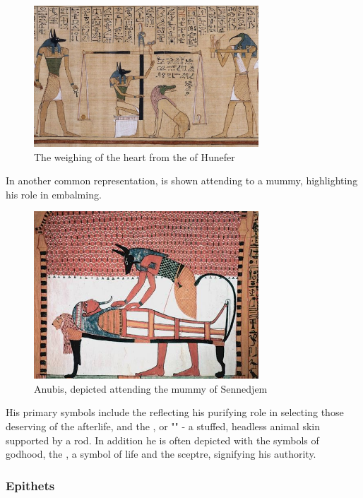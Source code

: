 \begin{figure} [H]
	\centering
	\includegraphics[width=0.75\textwidth]{../photos/Anubis_Hunefer}
	\caption{The weighing of the heart from the  of Hunefer}
\end{figure}

In another common representation,  is shown attending to a mummy, highlighting his role in embalming.

\begin{figure} [H]
	\centering
	\includegraphics[width=0.75\textwidth]{../photos/Anubis_Sennedjem}
	\caption{Anubis, depicted attending the mummy of Sennedjem}
\end{figure}

His primary symbols include the  reflecting his purifying role in selecting those deserving of the afterlife, and the , or "" - a stuffed, headless animal skin supported by a rod. In addition he is often depicted with the symbols of godhood, the , a symbol of life and the  sceptre, signifying his authority.

\subsubsection*{Epithets}

